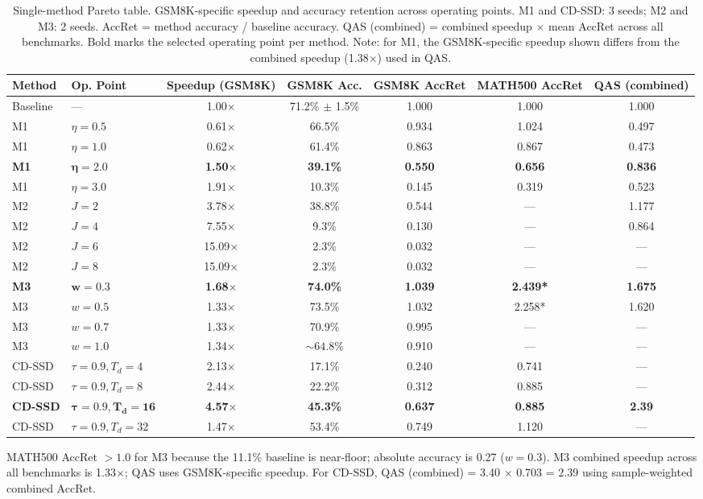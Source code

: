 \documentclass{article}
\begin{document}
\begin{table}[t]
\caption{Single-method Pareto table. GSM8K-specific speedup and accuracy retention across operating
points. M1 and CD-SSD: 3 seeds; M2 and M3: 2 seeds. AccRet = method accuracy / baseline accuracy.
QAS (combined) = combined speedup $\times$ mean AccRet across all benchmarks. Bold marks the selected
operating point per method. Note: for M1, the GSM8K-specific speedup shown differs from the combined
speedup (1.38$\times$) used in QAS.}
\label{tab:pareto}
\centering
\small
\setlength{\tabcolsep}{4pt}
\begin{tabular}{llccccc}
\toprule
\textbf{Method} & \textbf{Op. Point} & \textbf{Speedup (GSM8K)} & \textbf{GSM8K Acc.}
  & \textbf{GSM8K AccRet} & \textbf{MATH500 AccRet} & \textbf{QAS (combined)} \\
\midrule
Baseline & --- & 1.00$\times$ & 71.2\% $\pm$ 1.5\% & 1.000 & 1.000 & 1.000 \\
\midrule
M1 & $\eta=0.5$ & 0.61$\times$ & 66.5\% & 0.934 & 1.024 & 0.497 \\
M1 & $\eta=1.0$ & 0.62$\times$ & 61.4\% & 0.863 & 0.867 & 0.473 \\
\textbf{M1} & $\boldsymbol{\eta=2.0}$ & \textbf{1.50$\times$} & \textbf{39.1\%}
  & \textbf{0.550} & \textbf{0.656} & \textbf{0.836} \\
M1 & $\eta=3.0$ & 1.91$\times$ & 10.3\% & 0.145 & 0.319 & 0.523 \\
\midrule
M2 & $J=2$ & 3.78$\times$ & 38.8\% & 0.544 & --- & 1.177 \\
M2 & $J=4$ & 7.55$\times$ & 9.3\% & 0.130 & --- & 0.864 \\
M2 & $J=6$ & 15.09$\times$ & 2.3\% & 0.032 & --- & --- \\
M2 & $J=8$ & 15.09$\times$ & 2.3\% & 0.032 & --- & --- \\
\midrule
\textbf{M3} & $\boldsymbol{w=0.3}$ & \textbf{1.68$\times$} & \textbf{74.0\%}
  & \textbf{1.039} & \textbf{2.439*} & \textbf{1.675} \\
M3 & $w=0.5$ & 1.33$\times$ & 73.5\% & 1.032 & 2.258* & 1.620 \\
M3 & $w=0.7$ & 1.33$\times$ & 70.9\% & 0.995 & --- & --- \\
M3 & $w=1.0$ & 1.34$\times$ & ${\sim}64.8\%$ & 0.910 & --- & --- \\
\midrule
CD-SSD & $\tau=0.9, T_d=4$ & 2.13$\times$ & 17.1\% & 0.240 & 0.741 & --- \\
CD-SSD & $\tau=0.9, T_d=8$ & 2.44$\times$ & 22.2\% & 0.312 & 0.885 & --- \\
\textbf{CD-SSD} & $\boldsymbol{\tau=0.9, T_d=16}$ & \textbf{4.57$\times$} & \textbf{45.3\%}
  & \textbf{0.637} & \textbf{0.885} & \textbf{2.39} \\
CD-SSD & $\tau=0.9, T_d=32$ & 1.47$\times$ & 53.4\% & 0.749 & 1.120 & --- \\
\bottomrule
\end{tabular}
{\small *MATH500 AccRet $> 1.0$ for M3 because the 11.1\% baseline is near-floor; absolute accuracy
is 0.27 ($w=0.3$). M3 combined speedup across all benchmarks is 1.33$\times$; QAS uses
GSM8K-specific speedup. For CD-SSD, QAS (combined) = 3.40 $\times$ 0.703 = 2.39 using
sample-weighted combined AccRet.}
\end{table}
\end{document}
